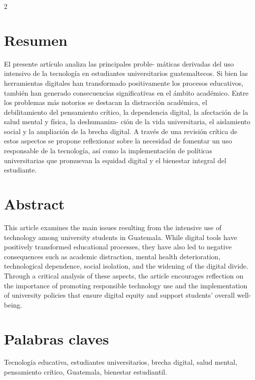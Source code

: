 \documentclass[12pt,spanish,Letterpaper,openany]{book}
\begin{document}
\begin {multicols}{2}

\hypertarget{resumen}{%
\section{Resumen}\label{resumen}}

El presente artículo analiza las principales proble-
máticas derivadas del uso intensivo de la tecnología en estudiantes universitarios guatemaltecos. Si bien las herramientas digitales han transformado positivamente los procesos educativos, también han generado consecuencias significativas en el ámbito académico. Entre los problemas más notorios se destacan la distracción académica, el debilitamiento del pensamiento crítico, la dependencia digital, la afectación de la salud mental y física, la deshumaniza-
ción de la vida universitaria, el aislamiento social y la ampliación de la brecha digital. A través de una revisión crítica de estos aspectos se propone reflexionar sobre la necesidad de fomentar un uso responsable de la tecnología, así como la implementación de políticas universitarias que promuevan la equidad digital y el bienestar integral del estudiante.

\hypertarget{abstract}{%
\section{Abstract}\label{abstract}}

This article examines the main issues resulting from the intensive use of technology among university students in Guatemala. While digital tools have positively transformed educational processes, they have also led to negative consequences such as academic distraction, mental health deterioration, technological dependence, social isolation, and the widening of the digital divide. Through a critical analysis of these aspects, the article encourages reflection on the importance of promoting responsible technology use and the implementation of university policies that ensure digital equity and support students' overall well-being.

\hypertarget{palabras-claves}{%
\section{Palabras claves}\label{palabras-claves}}

Tecnología educativa, estudiantes universitarios, brecha digital, salud mental, pensamiento crítico, Guatemala, bienestar estudiantil.


\end{multicols}
\end{document}
